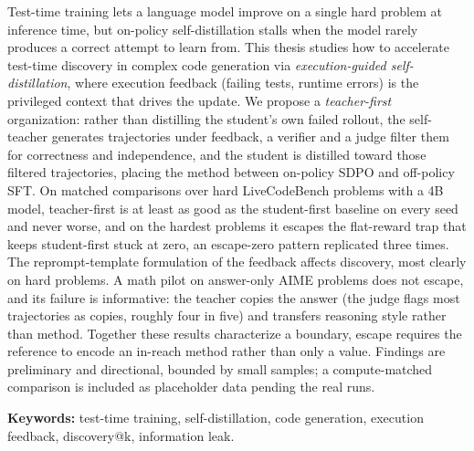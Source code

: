 Test-time training lets a language model improve on a single hard
problem at inference time, but on-policy self-distillation stalls when
the model rarely produces a correct attempt to learn from. This thesis
studies how to accelerate test-time discovery in complex code generation
via \emph{execution-guided self-distillation}, where execution feedback
(failing tests, runtime errors) is the privileged context that drives
the update. We propose a \emph{teacher-first} organization: rather than
distilling the student's own failed rollout, the self-teacher generates
trajectories under feedback, a verifier and a judge filter them for
correctness and independence, and the student is distilled toward those
filtered trajectories, placing the method between on-policy SDPO and
off-policy SFT. On matched comparisons over hard LiveCodeBench problems
with a 4B model, teacher-first is at least as good as the student-first
baseline on every seed and never worse, and on the hardest problems it
escapes the flat-reward trap that keeps student-first stuck at zero, an
escape-zero pattern replicated three times. The reprompt-template
formulation of the feedback affects discovery, most clearly on hard
problems. A math pilot on answer-only AIME problems does not escape, and
its failure is informative: the teacher copies the answer (the judge
flags most trajectories as copies, roughly four in five) and transfers
reasoning style rather than method. Together these results characterize
a boundary, escape requires the reference to encode an in-reach method
rather than only a value. Findings are preliminary and directional,
bounded by small samples; a compute-matched comparison is included as
placeholder data pending the real runs.

\textbf{Keywords:} test-time training, self-distillation, code
generation, execution feedback, discovery@k, information leak.
